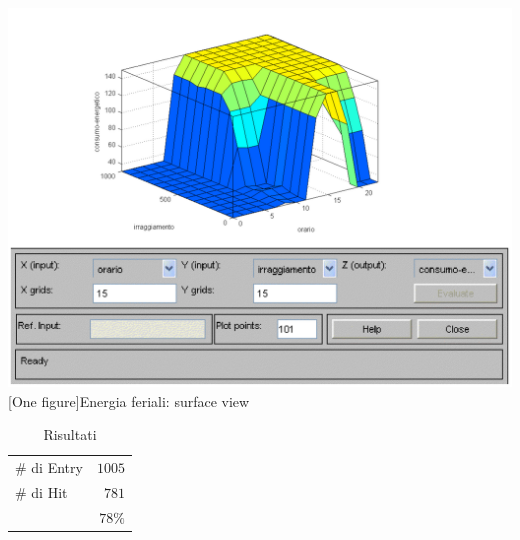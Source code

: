 \includegraphics[scale=0.5]{images/fuzzy/energia_feriali_surface_view.pdf}
[One figure]{Energia feriali: surface view}
\vspace{20px}
\begin{table}
  \caption{Risultati}
  \centering
	\begin{tabular}{lr}
		\toprule
      \# di Entry & $ 1005 $ \\
			\# di Hit   & $ 781 $ \\
		\midrule
			& $ 78\% $ \\
		\bottomrule
	\end{tabular}
\end{table}


